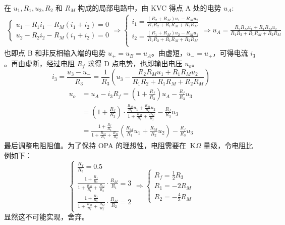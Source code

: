 \documentclass[UTF8]{report}
\def\KO{\ \mathrm{K}\Omega}
\theoremstyle{MyLineTheoremStyle} %
\theoremstyle{MyBlockTheoremStyle} %
\theoremstyle{MySubsubsectionStyle} %
\begin{document}
在 $u_1, R_1, u_2, R_2 $ 和 $R_M$ 构成的局部电路中，由 KVC 得点 A 处的电势 $u_A$:
\begin{gather*}
\begin{cases}
    u_1 - R_1i_1 - R_M(i_1 + i_2) = 0 \\
u_2 - R_2i_2 - R_M(i_1 + i_2) = 0
\end{cases}
\Longrightarrow 
\begin{cases}
    i_1 = \frac{(R_2+R_M)u_1 - R_Mu_2}{R_1R_2 +R_1R_M + R_2R_M} \\ 
    i_2 = \frac{(R_1+R_M)u_2 - R_Mu_1}{R_1R_2 +R_1R_M + R_2R_M} \\ 
\end{cases}\Longrightarrow 
u_A = \frac{R_2R_Mu_1 + R_1R_Mu_2}{R_1R_2 +R_1R_M + R_2R_M}
\end{gather*}
也即点 B 和非反相输入端的电势 $u_+ = u_B = u_A$。由虚短，$u_- = u_+$，可得电流 $i_3$。再由虚断，经过电阻 $R_f$ 求得 D 点电势，也即输出电压 $u_o$。
\begin{equation}
i_3 = \frac{u_3 - u_-}{R_3} = \frac{1}{R_3}(u_3 - \frac{R_2R_Mu_1 + R_1R_Mu_2}{R_1R_2 +R_1R_M + R_2R_M}) 
\end{equation}
\begin{align}
u_o &= u_A - i_3R_f = (1+\frac{R_f}{R_3})u_A - \frac{R_f}{R_3}u_3 
\\
&= (1+\frac{R_f}{R_3})\cdot \frac{\frac{R_M}{R_1}u_1 + \frac{R_M}{R_2}u_2}{1 + \frac{R_M}{R_1} + \frac{R_M}{R_2}} - \frac{R_f}{R_3}u_3
\\ 
&=\frac{1+\frac{R_f}{R_3}}{1 + \frac{R_M}{R_1} + \frac{R_M}{R_2}}
\left( \frac{R_M}{R_1}u_1 + \frac{R_M}{R_2}u_2  \right) - \frac{R_f}{R_3}u_3
\end{align}
最后调整电阻阻值。为了保持 OPA 的理想性，电阻需要在 $\KO$ 量级，令电阻比例如下：
\begin{equation}
\begin{cases}
    \frac{R_f}{R_3} = 0.5 \\ 
    \frac{1+\frac{R_f}{R_3}}{1 + \frac{R_M}{R_1} + \frac{R_M}{R_2}}\cdot \frac{R_M}{R_1} = 3 \\ 
    \frac{1+\frac{R_f}{R_3}}{1 + \frac{R_M}{R_1} + \frac{R_M}{R_2}}\cdot \frac{R_M}{R_2} = 2
\end{cases}\Longrightarrow 
\begin{cases}
    R_f = \frac{1}{2}R_3 \\ 
    R_1 =  -2R_M\\ 
    R_2 = -\frac{4}{3}R_M
\end{cases}
\end{equation}
显然这不可能实现，舍弃。
\end{document}
